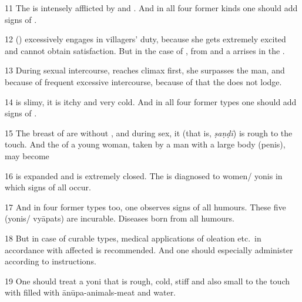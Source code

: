 \begin{translation}
\item [11] The  is intensely afflicted by  and .
And in all four former kinds one should add signs of . 

\item [12] %
() excessively engages in villagers' duty, because she gets extremely excited and cannot obtain satisfaction. 
But in the case of , from  and  a  arrises in the . 

\item[13]
During sexual intercourse,  reaches climax first, she surpasses the man,
and because of frequent excessive intercourse, because of that the  does not lodge.

\item [14]
  is slimy, it is itchy and very cold. And in all four former types one should add signs of .

\item [15]
The breast of  are without , and during sex, it (that is, \textit{ṣaṇḍī}) is rough to the touch.
And the  of a young woman, taken by a man with a large body (penis), may become 

\item [16]
 is expanded and  is extremely closed.
The  is diagnosed to women/ yonis in which signs of all  occur.

\item [17]
And in four former types too, one observes signs of all humours.
These five (yonis/ vyāpats) are incurable. Diseases born from all humours.

\item [18]
But in case of curable types, medical applications of oleation etc.\ in accordance with affected  is recommended.
And one should especially administer  according to instructions.

\item [19]
One should treat a yoni that is rough, cold, stiff and also small to the touch with  filled with ānūpa-animals-meat and water.


\end{translation}

